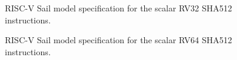 \begin{figure}[h]

\caption{RISC-V Sail model specification for the scalar RV32 SHA512 instructions.}
\label{fig:sail:sha512:rv32}
\end{figure}

\begin{figure}[h]

\caption{RISC-V Sail model specification for the scalar RV64 SHA512 instructions.}
\label{fig:sail:sha512:rv64}
\end{figure}
